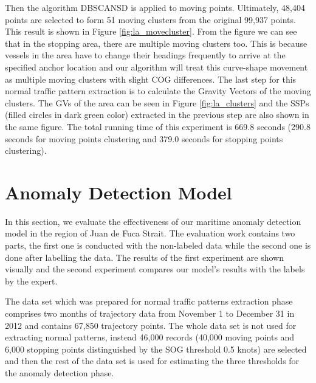 \documentclass[12pt,glossary]{dalcsthesis}
\begin{document}
Then the algorithm DBSCANSD is applied to moving points. Ultimately, 48,404 points are selected to form 51 moving clusters from the original 99,937 points. This result is shown in Figure \ref{fig:la_movecluster}. From the figure we can see that in the stopping area, there are multiple moving clusters too. This is because vessels in the area have to change their headings frequently to arrive at the specified anchor location and our algorithm will treat this curve-shape movement as multiple moving clusters with slight COG differences. The last step for this normal traffic pattern extraction is to calculate the Gravity Vectors of the moving clusters. The GVs of the area can be seen in Figure \ref{fig:la_clusters} and the SSPs (filled circles in dark green color) extracted in the previous step are also shown in the same figure. The total running time of this experiment is 669.8 seconds (290.8 seconds for moving points clustering and 379.0 seconds for stopping points clustering).


\section{Anomaly Detection Model}
\label{sec:exp_2}
In this section, we evaluate the effectiveness of our maritime anomaly detection model in the region of Juan de Fuca Strait. %
The evaluation work contains two parts, the first one is conducted with the non-labeled data while the second one is done after labelling the data. The results of the first experiment are shown visually and the second experiment compares our model's results with the labels by the expert.


The data set which was prepared for normal traffic patterns extraction phase comprises two months of trajectory data from November 1 to December 31 in 2012 and contains 67,850 trajectory points. The whole data set is not used for extracting normal patterns, instead 46,000 records (40,000 moving points and 6,000 stopping points distinguished by the SOG threshold 0.5 knots) are selected and then the rest of the data set is used for estimating the three thresholds for the anomaly detection phase. 
\end{document}
